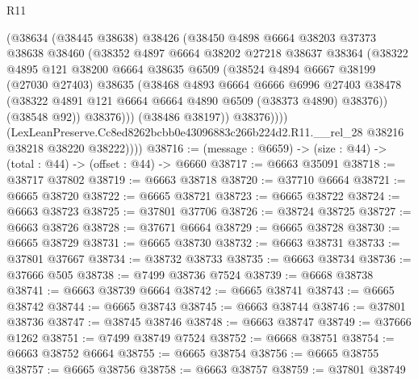 \begin{lexlean}{R11}
\begin{coremodule}
                  (@38634
                    (@38445 @38638)
                    @38426
                    (@38450
                      @4898
                      @6664
                      @38203
                      @37373
                      @38638
                      @38460
                      (@38352
                        @4897
                        @6664
                        @38202
                        @27218
                        @38637
                        @38364
                        (@38322
                          @4895
                          @121
                          @38200
                          @6664
                          @38635
                          @6509
                          (@38524
                            @4894
                            @6667
                            @38199
                            (@27030 @27403)
                            @38635
                            (@38468
                              @4893
                              @6664
                              @6666
                              @6996
                              @27403
                              @38478
                              (@38322 @4891 @121 @6664 @6664 @4890 @6509 (@38373 @4890) @38376))
                            (@38548 @92))
                          @38376)))
                    (@38486 @38197))
                  @38376))))
          (LexLeanPreserve.Cc8ed8262bcbb0e43096883c266b224d2.R11.__rel_28
            @38216
            @38218
            @38220
            @38222))))
@38716 := (message : @6659) -> (size : @44) -> (total : @44) -> (offset : @44) -> @6660
@38717 := @6663 @35091
@38718 := @38717 @37802
@38719 := @6663 @38718
@38720 := @37710 @6664
@38721 := @6665 @38720
@38722 := @6665 @38721
@38723 := @6665 @38722
@38724 := @6663 @38723
@38725 := @37801 @37706
@38726 := @38724 @38725
@38727 := @6663 @38726
@38728 := @37671 @6664
@38729 := @6665 @38728
@38730 := @6665 @38729
@38731 := @6665 @38730
@38732 := @6663 @38731
@38733 := @37801 @37667
@38734 := @38732 @38733
@38735 := @6663 @38734
@38736 := @37666 @505
@38738 := @7499 @38736 @7524
@38739 := @6668 @38738
@38741 := @6663 @38739 @6664
@38742 := @6665 @38741
@38743 := @6665 @38742
@38744 := @6665 @38743
@38745 := @6663 @38744
@38746 := @37801 @38736
@38747 := @38745 @38746
@38748 := @6663 @38747
@38749 := @37666 @1262
@38751 := @7499 @38749 @7524
@38752 := @6668 @38751
@38754 := @6663 @38752 @6664
@38755 := @6665 @38754
@38756 := @6665 @38755
@38757 := @6665 @38756
@38758 := @6663 @38757
@38759 := @37801 @38749

\end{coremodule}
\end{lexlean}
